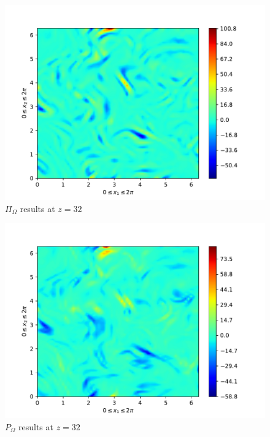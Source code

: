 \begin{figure}[H]
    \includegraphics[height=0.4\textheight]{media/run-cds-00/SGS-transport-term-enstrophy}
    \caption{$\Pi_{\Omega}$ results at $z=32$}
\end{figure}

\begin{figure}[H]
    \includegraphics[height=0.4\textheight]{media/run-cds-00/SGS-production-term-enstrophy}
    \caption{$P_{\Omega}$ results at $z=32$}
\end{figure}

